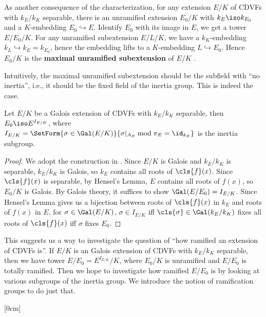 \documentclass[11pt]{amsart}
\begin{document}
As another consequence of the characterization, for any extension $E/K$ of CDVFs
with $k_E/k_K$ separable, there is an unramified extension $E_0/K$ with $k_E
\iso k_{E_0}$ and a $K$-embedding $E_0 \hookrightarrow E$.  Identify $E_0$ with
its image in $E$, we get a tower $E/E_0/K$.  For any unramified subextension
$E/L/K$, we have a $k_K$-embedding $k_L \hookrightarrow k_E = k_{E_0}$, hence
the embedding lifts to a $K$-embedding $L \hookrightarrow E_0$.  Hence $E_0/K$
is the {\bf maximal unramified subextension} of $E/K$ .

Intuitively, the maximal unramified subextension should be the subfield with
``no inertia'', i.e., it should be the fixed field of the inertia group.  This is
indeed the case.

\begin{prop}
    Let $E/K$ be a Galois extension of CDVFs with $k_E/k_K$ separable, then $E_0
    \iso E^{I_{E/K}}$, where $I_{E/K} = \SetForm{\sigma \in
        \Gal(E/K)}{\sigma|_{A_E} \bmod{\pi_E} = \id_{k_E}}$ is the inertia
    subgroup.
\end{prop}

\begin{proof}
    We adopt the construction in .  Since $E/K$ is
    Galois and $k_E/k_K$ is separable, $k_E/k_K$ is Galois, so $k_E$ contains
    all roots of $\cls{f}(x)$.  Since $\cls{f}(x)$ is separable, by Hensel's
    Lemma, $E$ contains all roots of $f(x)$, so $E_0/K$ is Galois.  By
    Galois theory, it suffices to show $\Gal(E/E_0) = I_{E/K}$.  Since Hensel's
    Lemma gives us a bijection between roots of $\cls{f}(x)$ in $k_E$ and roots
    of $f(x)$ in $E$, for $\sigma \in \Gal(E/K)$, $\sigma \in I_{E/K}$ iff
    $\cls{\sigma} \in \Gal(k_E/k_K)$ fixes all roots of $\cls{f}(x)$ iff
    $\sigma$ fixes $E_0$.
\end{proof}

This suggests us a way to investigate the question of ``how ramified an
extension of CDVFs is''.  If $E/K$ is an Galois extension of CDVFs with
$k_E/k_K$ separable, then we have tower $E/E_0 = E^{I_{E/K}}/K$, where $E_0/K$
is unramified and $E/E_0$ is totally ramified.  Then we hope to investigate how
ramified $E/E_0$ is by looking at various subgroups of the inertia group.  We
introduce the notion of ramification groups to do just that.

\medbreak

[0cm]
\end{document}
